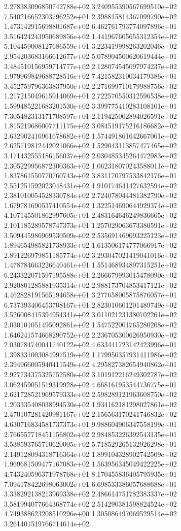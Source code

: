 2.278383096850742788e+02 3.240955390567699510e+02 7.540216652303796252e+01
2.398815814367099790e+02 1.473142915698801687e+02 6.462761793774097896e+01
3.516424243950689856e+02 1.441967605655312354e+02 5.104459008127686559e+01
3.223419998263202046e+02 2.954203683166612677e+02 5.078904500620619444e+01
3.484510156959714777e+02 2.128074545097974237e+02 1.979969849688728516e+02
7.421582310034179386e+01 3.452759796363837950e+02 2.271699710179988756e+02
1.217215049615914069e+01 2.722570550312596538e+02 1.599485221683201530e+02
3.399775410283108101e+01 7.305482313171708597e+01 2.119425002894026591e+02
1.815219686007711175e+02 3.084519175216186682e+02 2.632902416961678682e+02
1.574491861642667061e+02 2.625719812442021066e+02 1.529043113857477465e+02
3.171432555186156037e+02 2.030485345264472983e+02 2.305229956872300363e+02
1.062318070243588011e+02 1.837861550770760743e+02 3.831170797533842176e+01
2.551251592023048431e+02 1.910174641427632594e+02 2.381010054528330784e+02
2.724078044481382790e+02 1.679781690537410554e+02 1.322514690644929374e+02
4.107145501862997605e+01 2.483164646249836665e+02 2.101185289578747373e+01
1.257029063673380591e+02 3.509445986969530509e+02 2.535691469093225123e+02
1.894654985821738933e+02 1.613506174777066917e+02 2.891226979851185774e+02
3.293047021419041016e+02 1.478784663226640461e+01 1.551468934897315251e+02
6.243322071597195588e+01 2.266679993015478090e+02 2.920801285881935314e+02
2.988173704853417121e+02 4.462828191565194658e+01 3.277658005875876057e+01
6.737393406453708167e+01 2.823010601201489749e+02 3.526008415394954341e+02
3.011021231380702261e+02 2.030101051495092861e+02 1.547522001765280208e+02
1.646241574668290752e+02 2.236705300626950930e+02 2.030784740041740122e+02
4.633441723142423996e+01 1.398331003084997519e+02 1.179950357931411986e+02
2.394966005940411549e+02 4.295827382654940862e+01 2.927734375325752580e+02
3.101912216249302787e+02 3.062459051519319928e+02 4.668161953544736775e+01
2.621728521969579333e+02 2.598289121963608750e+02 1.203335408038994530e+02
1.934162181298027861e+02 2.470107281420981167e+02 2.156563170241746832e+02
4.630716834581737373e+01 9.988604906347558199e+01 2.766557718451156802e+02
2.984853226392543135e+01 3.538593765710620005e+02 5.718529265132926298e+01
2.149128094318716364e+02 1.899104328902742509e+02 1.969681509477167083e+02
1.563956345049422225e+02 4.743240596371978768e+01 8.170455836405795935e+01
7.094178422698063002e+01 6.698533386057688688e+01 3.338292138213969338e+02
2.486614751782383337e+02 3.581994077664368774e+02 2.514290381598824524e+02
4.749388623208510296e+00 1.305086497069529514e+02 3.261401519766714614e+02
